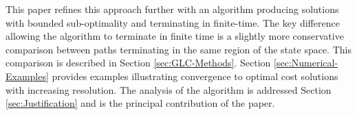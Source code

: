 \documentclass{llncs}
\newcommand{\GLC}{\ensuremath{\mathrm{GLC}}\xspace}
\newcommand{\SST}{\ensuremath{\mathrm{SST}}\xspace}
\begin{document}
%
%
%
This paper refines this approach further with an algorithm producing solutions with bounded sub-optimality and terminating in finite-time. 
%
The key difference allowing the algorithm to terminate in finite time is a slightly more conservative comparison between paths terminating in the same region of the state space. 
%
This comparison is described in Section \ref{sec:GLC-Methods}.
%
Section \ref{sec:Numerical-Examples} provides examples illustrating convergence to optimal cost solutions with increasing resolution. 
%
The analysis of the algorithm is addressed Section \ref{sec:Justification} and is the principal contribution of the paper.
%

%
%
\end{document}
